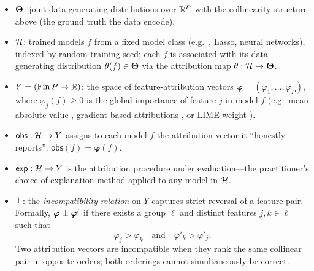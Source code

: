\begin{itemize}
  \item $\mathbf{\Theta}$: joint data-generating distributions over $\mathbb{R}^P$ with the collinearity
    structure above (the ground truth the data encode).

  \item $\mathcal{H}$: trained models $f$ from a fixed model class (e.g.\ \GBDT{}, Lasso,
    neural networks), indexed by random training seed; each $f$ is associated with its
    data-generating distribution $\theta(f) \in \mathbf{\Theta}$ via the attribution map
    $\theta: \mathcal{H} \to \mathbf{\Theta}$.

  \item $Y = (\mathrm{Fin}\,P \to \mathbb{R})$: the space of feature-attribution vectors
    $\boldsymbol{\varphi} = (\varphi_1,\ldots,\varphi_P)$, where $\varphi_j(f) \geq 0$
    is the global importance of feature $j$ in model $f$ (e.g.\ mean absolute \SHAP{}
    value \citep{lundberg2017unified}, gradient-based attributions
    \citep{sundararajan2020many}, or LIME weight \citep{ribeiro2016should}).

  \item $\mathsf{obs}: \mathcal{H} \to Y$ assigns to each model $f$ the attribution vector it
    ``honestly reports'': $\mathsf{obs}(f) = \boldsymbol{\varphi}(f)$.

  \item $\mathsf{exp}: \mathcal{H} \to Y$ is the attribution procedure under evaluation---the
    practitioner's choice of explanation method applied to any model in $\mathcal{H}$.

  \item $\perp$: the \emph{incompatibility relation} on $Y$ captures strict reversal
    of a feature pair.  Formally, $\boldsymbol{\varphi} \perp \boldsymbol{\varphi}'$
    if there exists a group $\ell$ and distinct features $j, k \in \ell$ such that
    \[
      \varphi_j > \varphi_k \quad \text{and} \quad \varphi'_k > \varphi'_j.
    \]
    Two attribution vectors are incompatible when they rank the same collinear pair in
    opposite orders; both orderings cannot simultaneously be correct.
\end{itemize}

